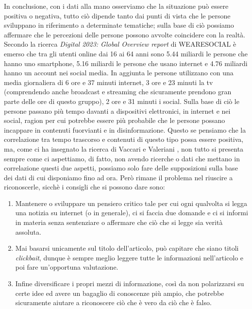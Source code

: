 \documentclass{article}
\begin{document}
\begin{justify}
    In conclusione, con i dati alla mano osserviamo che la situazione può essere positiva o negativa, tutto ciò dipende tanto dai punti di vista che le persone sviluppano in riferimento a determinate tematiche; sulla base di ciò possiamo affermare che le percezioni delle persone possono avvolte coincidere con la realtà.
    Secondo la ricerca \textit{Digital 2023: Global Overview report} di WEARESOCIAL è emerso che tra gli utenti online dai 16 ai 64 anni sono 5.44 miliardi le persone che hanno uno smartphone, 5.16 miliardi le persone che usano internet e 4.76 miliardi hanno un account nei social media. In aggiunta le persone utilizzano con una media giornaliera di 6 ore e 37 minuti internet, 3 ore e 23 minuti la tv (comprendendo anche broadcast e streaming che sicuramente prendono gran parte delle ore di questo gruppo), 2 ore e 31 minuti i social.\citep{WEARESOCIAL}
    Sulla base di ciò le persone passano più tempo davanti a dispositivi elettronici, in internet e nei social, ragion per cui potrebbe essere più probabile che le persone possano incappare in contenuti fuorvianti e in disinformazione. Questo se pensiamo che la correlazione tra tempo trascorso e contenuti di questo tipo possa essere positiva, ma, come ci ha insegnato la ricerca di Vaccari e Valeriani \citep{vaccari_outside_2021}, non tutto si presenta sempre come ci aspettiamo, di fatto, non avendo ricerche o dati che mettano in correlazione questi due aspetti, possiamo solo fare delle supposizioni sulla base dei dati di cui disponiamo fino ad ora.
    Però rimane il problema nel riuscire a riconoscerle, sicchè i consigli che si possono dare sono:
    \begin{enumerate}
    \item Mantenere o sviluppare un pensiero critico tale per cui ogni qualvolta si legga una notizia su internet (o in generale), ci si faccia due domande e ci si informi in materia senza sentenziare o affermare che ciò che si legge sia verità assoluta.
    \item Mai basarsi unicamente sul titolo dell'articolo, può capitare che siano titoli \textit{clickbait}, dunque è sempre meglio leggere tutte le informazioni nell'articolo e poi fare un'opportuna valutazione.
    \item Infine diversificare i propri mezzi di informazione, così da non polarizzarsi su certe idee ed avere un bagaglio di conoscenze più ampio, che potrebbe sicuramente aiutare a riconoscere ciò che è vero da ciò che è falso.
    \end{enumerate}
\end{justify}

\begin{justify}
    
    
\end{justify}
\end{document}
